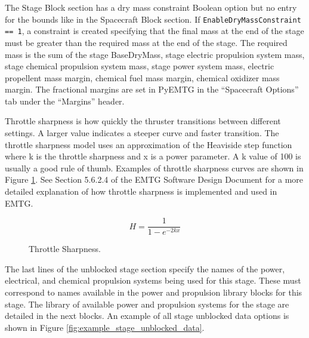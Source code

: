 \documentclass[11pt]{article}
\begin{document}
\noindent The Stage Block section has a dry mass constraint Boolean option but no entry for the bounds like in the Spacecraft Block section. If \texttt{EnableDryMassConstraint == 1}, a constraint is created specifying that the final mass at the end of the stage must be greater than the required mass at the end of the stage. The required mass is the sum of the stage BaseDryMass, stage electric propulsion system mass, stage chemical propulsion system mass, stage power system mass, electric propellent mass margin, chemical fuel mass margin, chemical oxidizer mass margin. The fractional margins are set in PyEMTG in the ``Spacecraft Options'' tab under the ``Margins'' header.

\noindent Throttle sharpness is how quickly the thruster transitions between different settings. A larger value indicates a steeper curve and faster transition. The throttle sharpness model uses an approximation of the Heaviside step function where k is the throttle sharpness and x is a power parameter. A k value of 100 is usually a good rule of thumb. Examples of throttle sharpness curves are shown in Figure \ref{fig:throttle_sharpness}. See Section 5.6.2.4 of the \ac{EMTG} Software Design Document for a more detailed explanation of how throttle sharpness is implemented and used in \ac{EMTG}.

\[H=\frac{1}{1-e^{-2kx}}\]

\begin{figure}[H]
	\centering
	\caption{\label{fig:throttle_sharpness}Throttle Sharpness.}
\end{figure}

\noindent The last lines of the unblocked stage section specify the names of the power, electrical, and chemical propulsion systems being used for this stage. These must correspond to names available in the power and propulsion library blocks for this stage. The library of available power and propulsion systems for the stage are detailed in the next blocks. An example of all stage unblocked data options is shown in Figure \ref{fig:example_stage_unblocked_data}.
\end{document}
